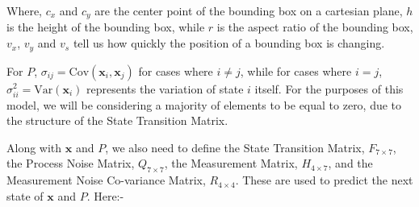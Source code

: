 \documentclass[10pt]{article}
\begin{document}
    \noindent Where, \(c_x\) and \(c_y\) are the center point of the bounding box on a cartesian plane, \(h\) is the height of the 
    bounding box, while \(r\) is the aspect ratio of the bounding box, \(v_x\), \(v_y\) and \(v_s\) tell us how quickly the position of a 
    bounding box is changing. 

    \noindent For \(P\), \(\sigma_{ij} = \text{Cov}(\mathbf{x}_i, \mathbf{x}_j)\) for cases where \(i \not= j\), while for cases where \(i = j\), 
    \(\sigma^2_{ii} = \text{Var}(\mathbf{x}_i)\) represents the variation of state \(i\) itself. For the purposes of this model, we will be considering a majority of elements to be equal to 
    zero, due to the structure of the State Transition Matrix.

    \noindent Along with \(\mathbf{x}\) and \(P\), we also need to define the State Transition Matrix, \(F_{7 \times 7}\), the Process Noise Matrix, \(Q_{7 \times 7}\), 
    the Measurement Matrix, \(H_{4 \times 7}\), and the Measurement Noise Co-variance Matrix, \(R_{4 \times 4}\). These are used to predict the next state of 
    \(\mathbf{x}\) and \(P\). Here:- 
\end{document}
